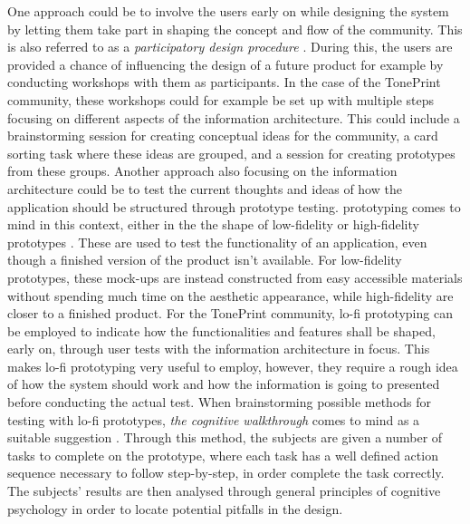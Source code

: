 \noindent
One approach could be to involve the users early on while designing the system by letting them take part in shaping the concept and flow of the community. This is also referred to as a \textit{participatory design procedure} \parencite{PDF:ParticipatoryDesignMethods}. During this, the users are provided a chance of influencing the design of a future product for example by conducting workshops with them as participants. In the case of the TonePrint community, these workshops could for example be set up with multiple steps focusing on different aspects of the information architecture. This could include a brainstorming session for creating conceptual ideas for the community, a card sorting task where these ideas are grouped, and a session for creating prototypes from these groups. Another approach also focusing on the information architecture could be to test the current thoughts and ideas of how the application should be structured through prototype testing. prototyping comes to mind in this context, either in the the shape of low-fidelity or high-fidelity prototypes \parencite[][228]{PDF:DonNorman}. These are used to test the functionality of an application, even though a finished version of the product isn't available. For low-fidelity prototypes, these mock-ups are instead constructed from easy accessible materials without spending much time on the aesthetic appearance, while high-fidelity are closer to a finished product. For the TonePrint community, lo-fi prototyping can be employed to indicate how the functionalities and features shall be shaped, early on, through user tests with the information architecture in focus. This makes lo-fi prototyping very useful to employ, however, they require a rough idea of how the system should work and how the information is going to presented before conducting the actual test. When brainstorming possible methods for testing with lo-fi prototypes, \textit{the cognitive walkthrough} comes to mind as a suitable suggestion \parencite{WEB:CognitiveWalkthrough}. Through this method, the subjects are given a number of tasks to complete on the prototype, where each task has a well defined action sequence necessary to follow step-by-step, in order complete the task correctly. The subjects' results are then analysed through general principles of cognitive psychology in order to locate potential pitfalls in the design.\\

